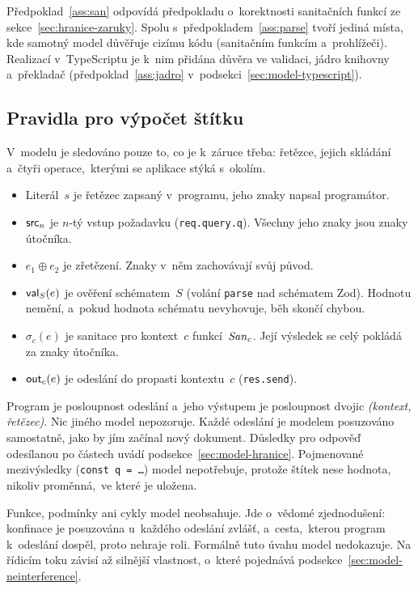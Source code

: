 Předpoklad~\ref{ass:san} odpovídá předpokladu o~korektnosti sanitačních funkcí ze sekce~\ref{sec:hranice-zaruky}. Spolu s~předpokladem~\ref{ass:parse} tvoří jediná místa, kde samotný model důvěřuje cizímu kódu (sanitačním funkcím a~prohlížeči). Realizací v~TypeScriptu je k~nim přidána důvěra ve validaci, jádro knihovny a~překladač (předpoklad~\ref{ass:jadro} v~podsekci~\ref{sec:model-typescript}).

\subsection{Pravidla pro výpočet štítku}
\label{sec:model-jazyk}

V~modelu je sledováno pouze to, co je k~záruce třeba: řetězce, jejich skládání a~čtyři operace,~kterými se aplikace stýká s~okolím.
\begin{itemize}
    \item Literál~$s$ je řetězec zapsaný v~programu, jeho znaky napsal programátor.
    \item $\mathsf{src}_n$ je $n$-tý vstup požadavku (\texttt{req.query.q}). Všechny jeho znaky jsou znaky útočníka.
    \item $e_1 \oplus e_2$ je zřetězení. Znaky v~něm zachovávají svůj původ.
    \item $\mathsf{val}_S(e)$ je ověření schématem~$S$ (volání \texttt{parse} nad schématem Zod). Hodnotu nemění, a~pokud hodnota schématu nevyhovuje, běh skončí chybou.
    \item $\sigma_c(e)$ je sanitace pro kontext~$c$ funkcí~$\mathit{San}_c$. Její výsledek se celý pokládá za znaky útočníka.
    \item $\mathsf{out}_c(e)$ je odeslání do propasti kontextu~$c$ (\texttt{res.send}).
\end{itemize}
Program je posloupnost odeslání a~jeho výstupem je posloupnost dvojic \emph{(kontext, řetězec)}. Nic jiného model nepozoruje. Každé odeslání je modelem posuzováno samostatně, jako by jím začínal nový dokument. Důsledky pro odpověď odesílanou po částech uvádí podsekce~\ref{sec:model-hranice}. Pojmenované mezivýsledky (\texttt{const q = \ldots}) model nepotřebuje, protože štítek nese hodnota, nikoliv proměnná,~ve které je uložena.

Funkce, podmínky ani cykly model neobsahuje. Jde o~vědomé zjednodušení: konfinace je posuzována u~každého odeslání zvlášť, a~cesta,~kterou program k~odeslání dospěl, proto nehraje roli. Formálně tuto úvahu model nedokazuje. Na řídicím toku závisí až silnější vlastnost, o~které pojednává podsekce~\ref{sec:model-neinterference}.

